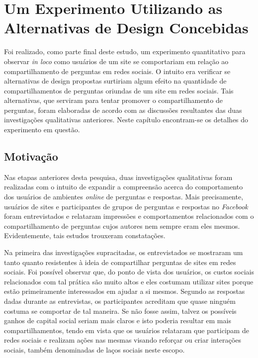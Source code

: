 \chapter{Um Experimento Utilizando as Alternativas de Design Concebidas}
Foi realizado, como parte final deste estudo, um experimento quantitativo para observar \textit{in loco} como usuários de um site \qa se comportariam em relação ao compartilhamento de perguntas em redes sociais. O intuito era verificar se alternativas de design propostas surtiriam algum efeito na quantidade de compartilhamentos de perguntas oriundas de um site \qa em redes sociais. Tais alternativas, que serviram para tentar promover o compartilhamento de perguntas, foram elaboradas de acordo com as discussões resultantes das duas investigações qualitativas anteriores. Neste capítulo encontram-se os detalhes do experimento em questão.

\section{Motivação}
Nas etapas anteriores desta pesquisa, duas investigações qualitativas foram realizadas com o intuito de expandir a compreensão acerca do comportamento dos usuários de ambientes \textit{online} de perguntas e respostas. Mais precisamente, usuários de sites \qa e participantes de grupos de perguntas e respostas no \textit{Facebook} foram entrevistados e relataram impressões e comportamentos relacionados com o compartilhamento de perguntas cujos autores nem sempre eram eles mesmos. Evidentemente, tais estudos trouxeram constatações.

Na primeira das investigações supracitadas, os entrevistados se mostraram um tanto quanto resistentes à ideia de compartilhar perguntas de sites \qa em redes sociais. Foi possível observar que, do ponto de vista dos usuários, os custos sociais relacionados com tal prática são muito altos e eles costumam utilizar sites \qa porque estão primeiramente interessados em ajudar a si mesmos. Segundo as respostas dadas durante as entrevistas, os participantes acreditam que quase ninguém costuma se comportar de tal maneira. Se não fosse assim, talvez os possíveis ganhos de capital social seriam mais claros e isto poderia resultar em mais compartilhamentos, tendo em vista que os usuários relataram que participam de redes sociais e realizam ações nas mesmas visando reforçar ou criar interações sociais, também denominadas de laços sociais neste escopo.

